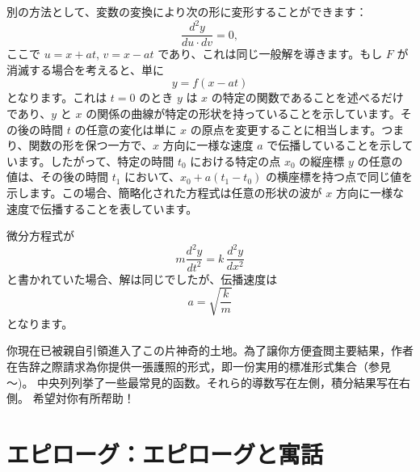 \documentclass[a4paper,11pt,openany]{ltjsbook}
\begin{document}
別の方法として、変数の変換により次の形に変形することができます：
\[
\frac{d^2y}{du \cdot dv} = 0,
\]
ここで $u = x + at$, $v = x - at$ であり、これは同じ一般解を導きます。もし $F$ が消滅する場合を考えると、単に
\[
y = f(x-at)
\]
となります。これは $t=0$ のとき $y$ は $x$ の特定の関数であることを述べるだけであり、$y$ と $x$ の関係の曲線が特定の形状を持っていることを示しています。その後の時間 $t$ の任意の変化は単に $x$ の原点を変更することに相当します。つまり、関数の形を保つ一方で、$x$ 方向に一様な速度 $a$ で伝播していることを示しています。したがって、特定の時間 $t_0$ における特定の点 $x_0$ の縦座標 $y$ の任意の値は、その後の時間 $t_1$ において、$x_0 + a(t_1 - t_0)$ の横座標を持つ点で同じ値を示します。この場合、簡略化された方程式は任意の形状の波が $x$ 方向に一様な速度で伝播することを表しています。

微分方程式が
\[
m \frac{d^2y}{dt^2} = k \, \frac{d^2y}{dx^2}
\]
と書かれていた場合、解は同じでしたが、伝播速度は
\[
a = \sqrt{\frac{k}{m}}
\]
となります。

你現在已被親自引領進入了この片神奇的土地。為了譲你方便査閲主要結果，作者在告辞之際請求為你提供一張護照的形式，即一份実用的標准形式集合（参見\pageref{stdforms1}～\pageref{stdforms2})。
中央列列挙了一些最常見的函数。それら的導数写在左側，積分結果写在右側。
希望対你有所帮助！



\chapter{エピローグ：エピローグと寓話}
\end{document}
